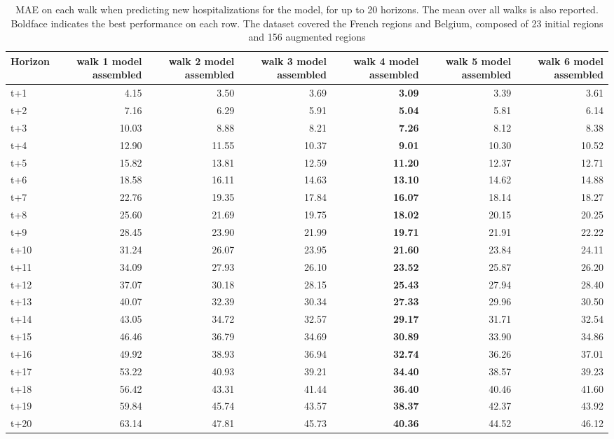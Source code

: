 \begin{table}[H]
\centering
\caption{MAE on each walk when predicting new hospitalizations for the model, for up to 20 horizons. The mean over all walks is also reported. Boldface indicates the best performance on each row. The dataset covered the French regions and Belgium, composed of 23 initial regions and 156 augmented regions }
\label{tab:MAE_walk_assembly}
\begin{tabular}{lrrrrrr}
\toprule
Horizon &  walk 1 model assembled &  walk 2 model assembled &  walk 3 model assembled &  walk 4 model assembled &  walk 5 model assembled &  walk 6 model assembled \\
\midrule
t+1  & 4.15  & 3.50  & 3.69  & \textbf{3.09}  & 3.39  & 3.61  \\
t+2  & 7.16  & 6.29  & 5.91  & \textbf{5.04}  & 5.81  & 6.14  \\
t+3  & 10.03  & 8.88  & 8.21  & \textbf{7.26}  & 8.12  & 8.38  \\
t+4  & 12.90  & 11.55  & 10.37  & \textbf{9.01}  & 10.30  & 10.52  \\
t+5  & 15.82  & 13.81  & 12.59  & \textbf{11.20}  & 12.37  & 12.71  \\
t+6  & 18.58  & 16.11  & 14.63  & \textbf{13.10}  & 14.62  & 14.88  \\
t+7  & 22.76  & 19.35  & 17.84  & \textbf{16.07}  & 18.14  & 18.27  \\
t+8  & 25.60  & 21.69  & 19.75  & \textbf{18.02}  & 20.15  & 20.25  \\
t+9  & 28.45  & 23.90  & 21.99  & \textbf{19.71}  & 21.91  & 22.22  \\
t+10  & 31.24  & 26.07  & 23.95  & \textbf{21.60}  & 23.84  & 24.11  \\
t+11  & 34.09  & 27.93  & 26.10  & \textbf{23.52}  & 25.87  & 26.20  \\
t+12  & 37.07  & 30.18  & 28.15  & \textbf{25.43}  & 27.94  & 28.40  \\
t+13  & 40.07  & 32.39  & 30.34  & \textbf{27.33}  & 29.96  & 30.50  \\
t+14  & 43.05  & 34.72  & 32.57  & \textbf{29.17}  & 31.71  & 32.54  \\
t+15  & 46.46  & 36.79  & 34.69  & \textbf{30.89}  & 33.90  & 34.86  \\
t+16  & 49.92  & 38.93  & 36.94  & \textbf{32.74}  & 36.26  & 37.01  \\
t+17  & 53.22  & 40.93  & 39.21  & \textbf{34.40}  & 38.57  & 39.23  \\
t+18  & 56.42  & 43.31  & 41.44  & \textbf{36.40}  & 40.46  & 41.60  \\
t+19  & 59.84  & 45.74  & 43.57  & \textbf{38.37}  & 42.37  & 43.92  \\
t+20  & 63.14  & 47.81  & 45.73  & \textbf{40.36}  & 44.52  & 46.12  \\

\bottomrule
\end{tabular}
\end{table}
